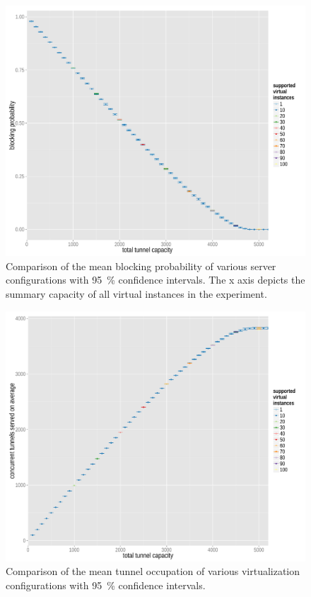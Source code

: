 \begin{figure}[htb]
	\centering
	\includegraphics[width=1.0\textwidth]{images/R-virtualized-blocking.pdf}
	\caption{Comparison of the mean blocking probability of various server configurations with \SI{95}{\percent} confidence intervals. The x axis depicts the summary capacity of all virtual instances in the experiment.}
\label{c4:fig:virtualized_blocking}
\end{figure}

\begin{figure}[htb]
	\centering
	\includegraphics[width=1.0\textwidth]{images/R-virtualized-tunnelusage.pdf}
	\caption{Comparison of the mean tunnel occupation of various virtualization configurations with \SI{95}{\percent} confidence intervals.}
\label{c4:fig:virtualized_tunnelusage}
\end{figure}

